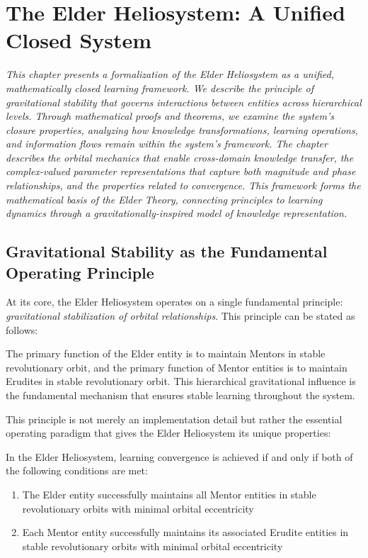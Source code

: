\chapter{The Elder Heliosystem: A Unified Closed System}

\textit{This chapter presents a formalization of the Elder Heliosystem as a unified, mathematically closed learning framework. We describe the principle of gravitational stability that governs interactions between entities across hierarchical levels. Through mathematical proofs and theorems, we examine the system's closure properties, analyzing how knowledge transformations, learning operations, and information flows remain within the system's framework. The chapter describes the orbital mechanics that enable cross-domain knowledge transfer, the complex-valued parameter representations that capture both magnitude and phase relationships, and the properties related to convergence. This framework forms the mathematical basis of the Elder Theory, connecting principles to learning dynamics through a gravitationally-inspired model of knowledge representation.}

\section{Gravitational Stability as the Fundamental Operating Principle}

At its core, the Elder Heliosystem operates on a single fundamental principle: \textit{gravitational stabilization of orbital relationships}. This principle can be stated as follows:

\begin{tcolorbox}[colback=TheoremBlue, colframe=DarkSkyBlue, title=The Fundamental Principle of the Elder Heliosystem, fonttitle=\bfseries\large]
The primary function of the Elder entity is to maintain Mentors in stable revolutionary orbit, and the primary function of Mentor entities is to maintain Erudites in stable revolutionary orbit. This hierarchical gravitational influence is the fundamental mechanism that ensures stable learning throughout the system.
\end{tcolorbox}

This principle is not merely an implementation detail but rather the essential operating paradigm that gives the Elder Heliosystem its unique properties:

\begin{theorem}
In the Elder Heliosystem, learning convergence is achieved if and only if both of the following conditions are met:
\begin{enumerate}
    \item The Elder entity successfully maintains all Mentor entities in stable revolutionary orbits with minimal orbital eccentricity
    \item Each Mentor entity successfully maintains its associated Erudite entities in stable revolutionary orbits with minimal orbital eccentricity
\end{enumerate}
\end{theorem}


